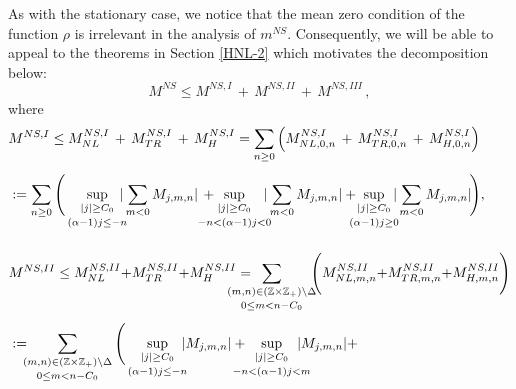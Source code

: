 \documentclass[a4paper,reqno]{amsart}
\numberwithin{equation}{section}
\theoremstyle{definition}
\newcommand{\Z}{\mathbb{Z}}
\def\a{\alpha}
\begin{document}
As with the stationary case, we notice that the mean zero condition of the function $\rho$ is irrelevant in the analysis of $m^{NS}$. Consequently, we will be able to appeal to the theorems in Section \ref{HNL-2} which motivates the decomposition below:
\begin{equation*}
	M^{NS}\le M^{NS,I}\,+\,M^{NS, II}\,+\,M^{NS, III}\,,
\end{equation*}
where
\begin{align}
	&M^{NS,I}
	\le M^{NS,I}_{NL}\,+\,M^{NS,I}_{TR}\,+\,M^{NS,I}_{H}
	=\sum_{n\ge 0}\left(M^{NS,I}_{NL,0,n} \,+\, M^{NS,I}_{TR,0,n}\,+\, M^{NS,I}_{H,0,n}\right)\nonumber\\[1ex]
	&:=\sum_{n\ge 0}\Bigg(
	\sup_{\substack{|j|\ge C_0\\[.5ex](\a-1)j\le -n\\}}\hspace{-.25cm} |\sum_{\substack{m<0}}M_{j,m,n}|\,+
	\hspace{-.5cm} \sup_{\substack{|j|\ge C_0\\[.5ex]-n<(\a-1)j<0\\}} \hspace{-.25cm} |\sum_{\substack{m<0}}M_{j,m,n}|+
	\hspace{-.1cm} \hspace{-.15cm}\sup_{\substack{|j|\ge C_0\\[.5ex](\a-1)j\geq 0\\}}\hspace{-.2cm} |\sum_{\substack{m<0}}M_{j,m,n}|\hspace{-.05cm}\Bigg),\nonumber\\[3ex]
	&M^{NS,II}
	\le M^{NS,II}_{NL}{+}M^{NS,II}_{TR}{+}M^{NS,II}_{H}
	=\hspace{-.7cm} \sum_{\substack{(m,n)\in (\Z\times\Z_{+})\setminus\Delta\\[.5ex]0\leq m<n-C_0}}
	\hspace{-.2cm} \Bigg(M^{NS,II}_{NL,m,n}{+}M^{NS,II}_{TR,m,n}{+}M^{NS,II}_{H,m,n} \Bigg)\nonumber
	\\[1ex]
	&:=\hspace{-.2cm}\sum_{\substack{(m,n)\in (\Z\times\Z_{+})\setminus\Delta\\[.5ex] 0\leq m<n-C_0}}\Bigg(
	\sup_{\substack{|j|\geq C_0\\[.5ex](\a-1)j\le-n\\}} \hspace{-.2cm}  |M_{j,m,n}|+
	\hspace{-.4cm}\sup_{\substack{|j|\geq C_0\\[.5ex]-n<(\a-1)j<m\\}} \hspace{-.4cm} |M_{j,m,n}| +

\end{align}
\end{document}
